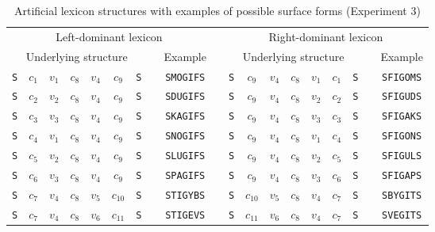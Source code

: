 \documentclass[doc,biblatex,floatsintext]{apa7}
\begin{document}
\begin{table}
\begin{center}
\begin{threeparttable}
\caption{Artificial lexicon structures with examples of possible surface forms (Experiment 3)}
\footnotesize
\label{table2}
\begin{tabular}{ccccccccccccccccccc}
\toprule
\multicolumn{9}{c}{Left-dominant lexicon} & & \multicolumn{9}{c}{Right-dominant lexicon} \\
\multicolumn{7}{c}{Underlying structure} & & Example & & \multicolumn{7}{c}{Underlying structure} & & Example \\
\texttt{S} & $c_1$ & $v_1$ & $c_8$ & $v_4$ & $c_9$ & \texttt{S} & & \texttt{SMOGIFS} & & \texttt{S} & $c_9$ & $v_4$ & $c_8$ & $v_1$ & $c_1$ & \texttt{S} & & \texttt{SFIGOMS} \\
\texttt{S} & $c_2$ & $v_2$ & $c_8$ & $v_4$ & $c_9$ & \texttt{S} & & \texttt{SDUGIFS} & & \texttt{S} & $c_9$ & $v_4$ & $c_8$ & $v_2$ & $c_2$ & \texttt{S} & & \texttt{SFIGUDS} \\
\texttt{S} & $c_3$ & $v_3$ & $c_8$ & $v_4$ & $c_9$ & \texttt{S} & & \texttt{SKAGIFS} & & \texttt{S} & $c_9$ & $v_4$ & $c_8$ & $v_3$ & $c_3$ & \texttt{S} & & \texttt{SFIGAKS} \\
\texttt{S} & $c_4$ & $v_1$ & $c_8$ & $v_4$ & $c_9$ & \texttt{S} & & \texttt{SNOGIFS} & & \texttt{S} & $c_9$ & $v_4$ & $c_8$ & $v_1$ & $c_4$ & \texttt{S} & & \texttt{SFIGONS} \\
\texttt{S} & $c_5$ & $v_2$ & $c_8$ & $v_4$ & $c_9$ & \texttt{S} & & \texttt{SLUGIFS} & & \texttt{S} & $c_9$ & $v_4$ & $c_8$ & $v_2$ & $c_5$ & \texttt{S} & & \texttt{SFIGULS} \\
\texttt{S} & $c_6$ & $v_3$ & $c_8$ & $v_4$ & $c_9$ & \texttt{S} & & \texttt{SPAGIFS} & & \texttt{S} & $c_9$ & $v_4$ & $c_8$ & $v_3$ & $c_6$ & \texttt{S} & & \texttt{SFIGAPS} \\
\texttt{S} & $c_7$ & $v_4$ & $c_8$ & $v_5$ & $c_{10}$ & \texttt{S} & & \texttt{STIGYBS} & & \texttt{S} & $c_{10}$ & $v_5$ & $c_8$ & $v_4$ & $c_7$ & \texttt{S} & & \texttt{SBYGITS} \\
\texttt{S} & $c_7$ & $v_4$ & $c_8$ & $v_6$ & $c_{11}$ & \texttt{S} & & \texttt{STIGEVS} & & \texttt{S} & $c_{11}$ & $v_6$ & $c_8$ & $v_4$ & $c_7$ & \texttt{S} & & \texttt{SVEGITS} \\
\bottomrule
\end{tabular} 
\end{threeparttable}
\end{center} 
\end{table}
\end{document}
